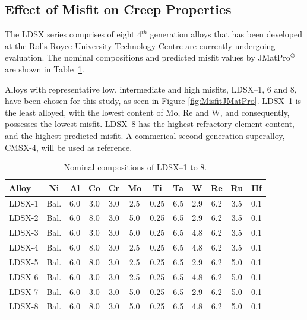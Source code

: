 \subsection{Effect of Misfit on Creep Properties}

The LDSX series comprises of eight 4$^{th}$ generation alloys that has been developed at the Rolls-Royce University Technology Centre are currently undergoing evaluation.  The nominal compositions and predicted misfit values by JMatPro$^{\copyright}$ are shown in Table~\ref{tab:LDSXcomps}.

Alloys with representative low, intermediate and high misfits, LDSX--1, 6 and 8, have been chosen for this study, as seen in Figure \ref{fig:MisfitJMatPro}.  LDSX--1 is the least alloyed, with the lowest content of Mo, Re and W, and consequently, possesses the lowest misfit.  LDSX--8 has the highest refractory element content, and the highest predicted misfit.  A commerical second generation superalloy, CMSX-4, will be used as reference.
%
\begin{table}[htdp]
\begin{center}
\begin{tabular}{lccccccccccc}
\hline\hline
Alloy 	&     Ni    &  Al   &  Co  &   Cr &   Mo     &Ti     & Ta    & W     &Re &    Ru    & Hf\\
\hline
LDSX-1  &   Bal.&    6.0&    3.0&     3.0&     2.5&    0.25&    6.5&    2.9&    6.2&     3.5&     0.1\\
LDSX-2    & Bal.&    6.0&    8.0&     3.0&     5.0&    0.25&    6.5&    2.9&    6.2&     3.5&     0.1\\
LDSX-3     &Bal.&    6.0&    3.0&     3.0&     5.0&    0.25&    6.5&    4.8&    6.2&     3.5&     0.1\\
LDSX-4 &    Bal.&    6.0&    8.0&     3.0&     2.5&    0.25&    6.5&    4.8&    6.2&     3.5&     0.1\\
LDSX-5 &    Bal.&    6.0&    8.0&     3.0&     2.5&    0.25&    6.5&    2.9&    6.2&     5.0&     0.1\\
LDSX-6  &   Bal.&    6.0&    3.0&     3.0&     2.5&    0.25&    6.5&    4.8&    6.2&     5.0&     0.1\\
LDSX-7  &   Bal.&    6.0&    3.0&     3.0&     5.0&    0.25&    6.5&    2.9&    6.2&     5.0&     0.1\\
LDSX-8  &   Bal.&    6.0&    8.0&     3.0&     5.0&    0.25&    6.5&    4.8&    6.2&     5.0&     0.1\\
\hline\hline
\end{tabular}
\end{center}
\caption{Nominal compositions of LDSX--1 to 8.}\label{tab:LDSXcomps}
\end{table}
